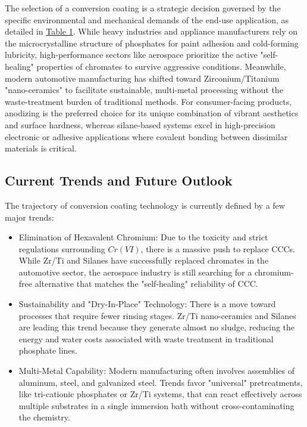 \documentclass[12pt]{article}
\begin{document}
            The selection of a conversion coating is a strategic decision governed by the specific environmental and mechanical demands of the end-use application, as detailed in \hyperref[coating_applications]{Table 1}. While heavy industries and appliance manufacturers rely on the microcrystalline structure of phosphates for paint adhesion and cold-forming lubricity, high-performance sectors like aerospace prioritize the active "self-healing" properties of chromates to survive aggressive conditions. Meanwhile, modern automotive manufacturing has shifted toward Zirconium/Titanium "nano-ceramics" to facilitate sustainable, multi-metal processing without the waste-treatment burden of traditional methods. For consumer-facing products, anodizing is the preferred choice for its unique combination of vibrant aesthetics and surface hardness, whereas silane-based systems excel in high-precision electronic or adhesive applications where covalent bonding between dissimilar materials is critical.

        \subsection{Current Trends and Future Outlook}

            The trajectory of conversion coating technology is currently defined by a few major trends:

            \begin{itemize}
                \item Elimination of Hexavalent Chromium: Due to the toxicity and strict regulations surrounding $Cr(VI)$, there is a massive push to replace CCCs. While Zr/Ti and Silanes have successfully replaced chromates in the automotive sector, the aerospace industry is still searching for a chromium-free alternative that matches the "self-healing" reliability of CCC.
                
                \item Sustainability and "Dry-In-Place" Technology: There is a move toward processes that require fewer rinsing stages. Zr/Ti nano-ceramics and Silanes are leading this trend because they generate almost no sludge, reducing the energy and water costs associated with waste treatment in traditional phosphate lines.
                
                \item Multi-Metal Capability: Modern manufacturing often involves assemblies of aluminum, steel, and galvanized steel. Trends favor "universal" pretreatments, like tri-cationic phosphates or Zr/Ti systems, that can react effectively across multiple substrates in a single immersion bath without cross-contaminating the chemistry.
            \end{itemize}
        
\end{document}
